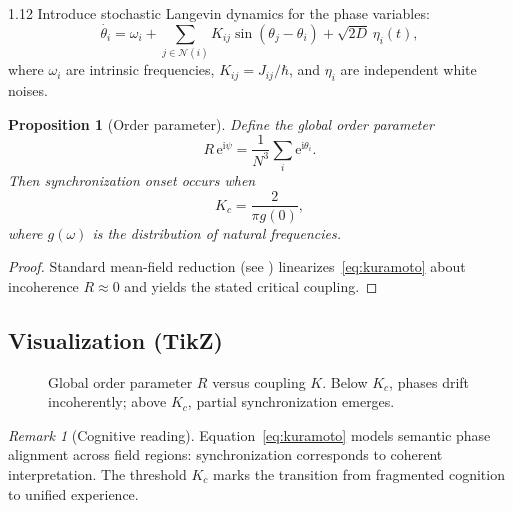 \documentclass[12pt,a4paper]{article}
\numberwithin{equation}{section}
\newtheorem{proposition}{Proposition}[section]
\theoremstyle{remark}
\newtheorem{remark}{Remark}[section]
\theoremstyle{definition}
\newcommand{\ii}{\mathrm{i}}
\newcommand{\ee}{\mathrm{e}}
\begin{document}
\begin{spacing}{1.12}
Introduce stochastic Langevin dynamics for the phase variables:
\begin{equation}
\dot{\theta_i}
=\omega_i
+\sum_{j\in\mathcal{N}(i)} K_{ij}\sin(\theta_j-\theta_i)
+\sqrt{2D}\,\eta_i(t),
\label{eq:kuramoto}
\end{equation}
where $\omega_i$ are intrinsic frequencies, $K_{ij}=J_{ij}/\hbar$, and $\eta_i$ are independent white noises.

\begin{proposition}[Order parameter]
\label{prop:order-parameter}
Define the global order parameter
\[
R\,\ee^{\ii\psi}
=\frac{1}{N^3}\sum_i \ee^{\ii\theta_i}.
\]
Then synchronization onset occurs when
\[
K_c = \frac{2}{\pi g(0)},
\]
where $g(\omega)$ is the distribution of natural frequencies.
\end{proposition}

\begin{proof}
Standard mean-field reduction (see \citealp{Kuramoto1984}) linearizes~\eqref{eq:kuramoto} about incoherence $R\approx0$ and yields the stated critical coupling.
\end{proof}

\subsection{Visualization (TikZ)}
\label{subsec:phase-diagram}

\begin{figure}[H]
\centering
{}
\caption{Global order parameter $R$ versus coupling $K$.
Below $K_c$, phases drift incoherently; above $K_c$, partial synchronization emerges.}
\label{fig:kuramoto-curve}
\end{figure}

\begin{remark}[Cognitive reading]
Equation~\eqref{eq:kuramoto} models semantic phase alignment across field regions: synchronization corresponds to coherent interpretation.
The threshold $K_c$ marks the transition from fragmented cognition to unified experience.
\end{remark}


\end{spacing}
\end{document}
